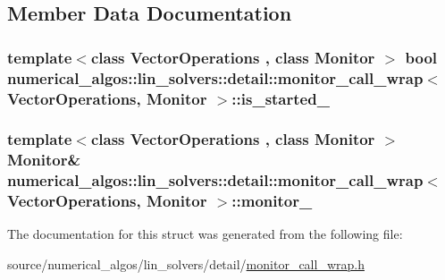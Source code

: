 \subsection{Member Data Documentation}
\hypertarget{structnumerical__algos_1_1lin__solvers_1_1detail_1_1monitor__call__wrap_a93ab759ef23d7dc025db946e9d8750c6}{
\subsubsection[{is\-\_\-started\-\_\-}]{\setlength{\rightskip}{0pt plus 5cm}template$<$class Vector\-Operations , class Monitor $>$ bool {\bf numerical\-\_\-algos\-::lin\-\_\-solvers\-::detail\-::monitor\-\_\-call\-\_\-wrap}$<$ Vector\-Operations, Monitor $>$\-::is\-\_\-started\-\_\-}}\label{structnumerical__algos_1_1lin__solvers_1_1detail_1_1monitor__call__wrap_a93ab759ef23d7dc025db946e9d8750c6}
\hypertarget{structnumerical__algos_1_1lin__solvers_1_1detail_1_1monitor__call__wrap_ac149b5e63f199d521a903a992c1580fa}{
\subsubsection[{monitor\-\_\-}]{\setlength{\rightskip}{0pt plus 5cm}template$<$class Vector\-Operations , class Monitor $>$ Monitor\& {\bf numerical\-\_\-algos\-::lin\-\_\-solvers\-::detail\-::monitor\-\_\-call\-\_\-wrap}$<$ Vector\-Operations, Monitor $>$\-::monitor\-\_\-}}\label{structnumerical__algos_1_1lin__solvers_1_1detail_1_1monitor__call__wrap_ac149b5e63f199d521a903a992c1580fa}


The documentation for this struct was generated from the following file\-:\begin{DoxyCompactItemize}
\item 
source/numerical\-\_\-algos/lin\-\_\-solvers/detail/\hyperlink{monitor__call__wrap_8h}{monitor\-\_\-call\-\_\-wrap.\-h}\end{DoxyCompactItemize}

